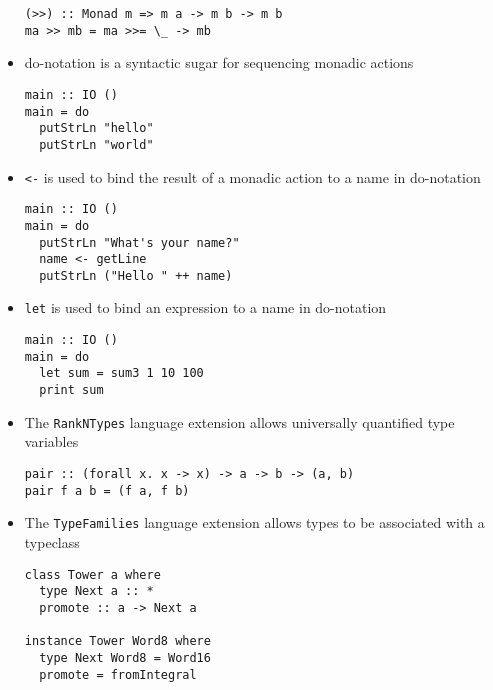\begin{itemize}
\begin{verbatim}
(>>) :: Monad m => m a -> m b -> m b
ma >> mb = ma >>= \_ -> mb
\end{verbatim}

\item do-notation is a syntactic sugar for sequencing monadic actions
\begin{verbatim}
main :: IO ()
main = do
  putStrLn "hello"
  putStrLn "world"
\end{verbatim}

\item \verb|<-| is used to bind the result of a monadic action to a
  name in do-notation
\begin{verbatim}
main :: IO ()
main = do
  putStrLn "What's your name?"
  name <- getLine
  putStrLn ("Hello " ++ name)
\end{verbatim}

\item \verb|let| is used to bind an expression to a name in
  do-notation
\begin{verbatim}
main :: IO ()
main = do
  let sum = sum3 1 10 100
  print sum
\end{verbatim}

\item The \verb|RankNTypes| language extension allows universally
  quantified type variables
\begin{verbatim}
pair :: (forall x. x -> x) -> a -> b -> (a, b)
pair f a b = (f a, f b)
\end{verbatim}

\item The \verb|TypeFamilies| language extension allows types to be
  associated with a typeclass
\begin{verbatim}
class Tower a where
  type Next a :: *
  promote :: a -> Next a

instance Tower Word8 where
  type Next Word8 = Word16
  promote = fromIntegral
\end{verbatim}
\end{itemize}
